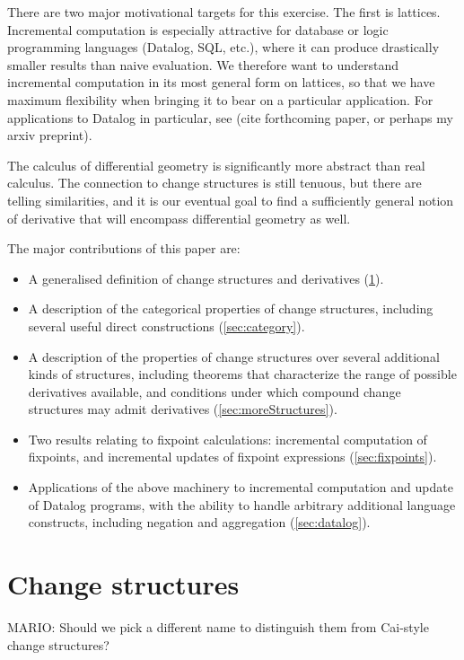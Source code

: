 There are two major motivational targets for this exercise. The first is
lattices. Incremental computation is especially attractive for database or logic
programming languages (Datalog, SQL, etc.), where it can produce drastically
smaller results than naive evaluation. We therefore want to understand
incremental computation in its most general form on lattices, so that we have
maximum flexibility when bringing it to bear on a particular application. For
applications to Datalog in particular, see (cite forthcoming paper, or perhaps
my arxiv preprint).

The calculus of differential geometry is significantly more abstract than real
calculus. The connection to change structures is still tenuous, but there are
telling similarities, and it is our eventual goal to find a sufficiently general
notion of derivative that will encompass differential geometry as well.

The major contributions of this paper are:
\begin{itemize}
  \item A generalised definition of change structures and derivatives
    (\cref{sec:change-structures}).
  \item A description of the categorical properties of change structures, including
    several useful direct constructions (\cref{sec:category}).
  \item A description of the properties of change structures over several
    additional kinds of structures, including theorems that characterize the range of
    possible derivatives available, and conditions under which compound change
    structures may admit derivatives (\cref{sec:moreStructures}).
  \item Two results relating to fixpoint calculations: incremental computation
    of fixpoints, and incremental updates of fixpoint expressions (\cref{sec:fixpoints}).
  \item Applications of the above machinery to incremental computation and
    update of Datalog programs, with the ability to handle arbitrary additional
    language constructs, including negation and aggregation (\cref{sec:datalog}).
\end{itemize}

\section{Change structures}
\label{sec:change-structures}

MARIO: Should we pick a different name to distinguish them from Cai-style change structures?


